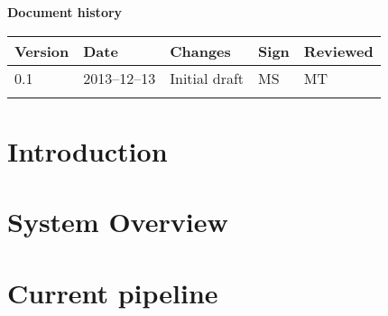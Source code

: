 \documentclass[10pt, a4paper, twoside]{article}
\numberwithin{equation}{subsection}
\numberwithin{figure}{section}
\numberwithin{table}{section}
\begin{document}



\newpage
\pagestyle{fancy}
\setcounter{page}{2} %




\newpage
\tableofcontents
\listoffigures
\listoftables



\newpage
\vspace*{5\baselineskip}

\begin{center}
\textbf{\LARGE Document history}

{ \footnotesize 
\begin{tabular}{|p{1cm}|p{2.0cm}|p{5cm}|p{1.5cm}|p{2cm}|}
	\hline

	\textbf{Version} & \textbf{Date} & \textbf{Changes} & \textbf{Sign} & \textbf{Reviewed} \\
	
	\hline
	0.1 & 2013--12--13 & Initial draft & MS & MT\\
	
	\hline
	 &  &  &  &  \\
	
	\hline
\end{tabular}
}
\end{center}





%
%
\newpage
{}

\newpage
\section{Introduction}
\label{sec:introduction}


\newpage
\section{System Overview}
\label{sec:system_overview}


\newpage
\section{Current pipeline}
\label{sec:current_pipeline}

\end{document}
